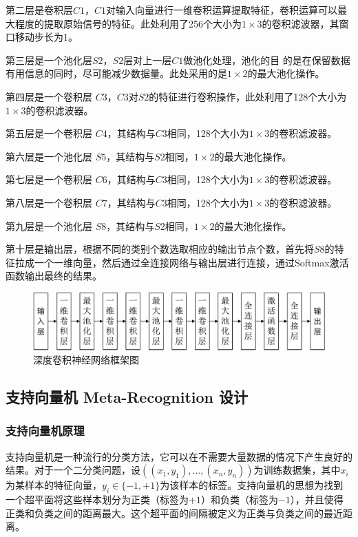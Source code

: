 第二层是卷积层$C1$，$C1$对输入向量进行一维卷积运算提取特征，卷积运算可以最
大程度的提取原始信号的特征。此处利用了256个大小为$1\times 3$的卷积滤波器，其窗口移动步长为1。

第三层是一个池化层$S2$，$S2$层对上一层$C1$做池化处理，池化的目
的是在保留数据有用信息的同时，尽可能减少数据量。此处采用的是$1\times 2$的最大池化操作。

第四层是一个卷积层 $C3$，$C3$对$S2$的特征进行卷积操作，此处利用了128个大小为$1\times 3$的卷积滤波器。

第五层是一个卷积层 $C4$，其结构与$C3$相同，128个大小为$1\times 3$的卷积滤波器。

第六层是一个池化层 $S5$，其结构与$S2$相同，$1\times 2$的最大池化操作。

第七层是一个卷积层 $C6$，其结构与$C3$相同，128个大小为$1\times 3$的卷积滤波器。

第八层是一个卷积层 $C7$，其结构与$C3$相同，128个大小为$1\times 3$的卷积滤波器。

第九层是一个池化层 $S8$，其结构与$S2$相同，$1\times 2$的最大池化操作。

第十层是输出层，根据不同的类别个数选取相应的输出节点个数，首先将$S8$的特征拉成一个一维向量，然后通过全连接网络与输出层进行连接，通过Softmax激活函数输出最终的结果。




\begin{figure}[hbt]
	\centering
	\includegraphics[width=13.5cm]{figures/emitter/struct_emitter}
	\caption{深度卷积神经网络框架图}
\end{figure}

\subsection{支持向量机 Meta-Recognition 设计}

\subsubsection{支持向量机原理}
支持向量机是一种流行的分类方法，它可以在不需要大量数据的情况下产生良好的结果。对于一个二分类问题，设$((x_1,y_1),\dots,(x_n,y_n))$为训练数据集，其中$x_i$为某样本的特征向量，$y_i\in\{-1,+1\}$为该样本的标签。支持向量机的思想为找到一个超平面将这些样本划分为正类（标签为$+1$）和负类（标签为$-1$），并且使得正类和负类之间的距离最大。这个超平面的间隔被定义为正类与负类之间的最近距离。

